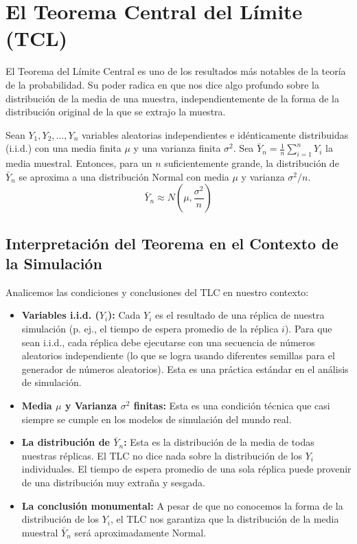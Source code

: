 \documentclass[11pt, letterpaper]{article}
\begin{document}
\newpage
\section{El Teorema Central del Límite (TCL)}

El Teorema del Límite Central es uno de los resultados más notables de la teoría de la probabilidad. Su poder radica en que nos dice algo profundo sobre la distribución de la media de una muestra, independientemente de la forma de la distribución original de la que se extrajo la muestra.

\begin{teorema}[TCL]
Sean $Y_1, Y_2, \dots, Y_n$ variables aleatorias independientes e idénticamente distribuidas (i.i.d.) con una media finita $\mu$ y una varianza finita $\sigma^2$. Sea $\bar{Y}_n = \frac{1}{n}\sum_{i=1}^{n} Y_i$ la media muestral. Entonces, para un $n$ suficientemente grande, la distribución de $\bar{Y}_n$ se aproxima a una distribución Normal con media $\mu$ y varianza $\sigma^2/n$.
\begin{equation}
\bar{Y}_n \approx N\left(\mu, \frac{\sigma^2}{n}\right)
\end{equation}
\end{teorema}

\subsection{Interpretación del Teorema en el Contexto de la Simulación}
Analicemos las condiciones y conclusiones del TLC en nuestro contexto:
\begin{itemize}
    \item \textbf{Variables i.i.d. ($Y_i$):} Cada $Y_i$ es el resultado de una réplica de nuestra simulación (p. ej., el tiempo de espera promedio de la réplica $i$). Para que sean i.i.d., cada réplica debe ejecutarse con una secuencia de números aleatorios independiente (lo que se logra usando diferentes semillas para el generador de números aleatorios). Esta es una práctica estándar en el análisis de simulación.
    
    \item \textbf{Media $\mu$ y Varianza $\sigma^2$ finitas:} Esta es una condición técnica que casi siempre se cumple en los modelos de simulación del mundo real.
    
    \item \textbf{La distribución de $\bar{Y}_n$:} Esta es la distribución de la media de todas nuestras réplicas. El TLC no dice nada sobre la distribución de los $Y_i$ individuales. El tiempo de espera promedio de una sola réplica puede provenir de una distribución muy extraña y sesgada.
    
    \item \textbf{La conclusión monumental:} A pesar de que no conocemos la forma de la distribución de los $Y_i$, el TLC nos garantiza que la distribución de la media muestral $\bar{Y}_n$ será aproximadamente Normal.
\end{itemize}
\end{document}
